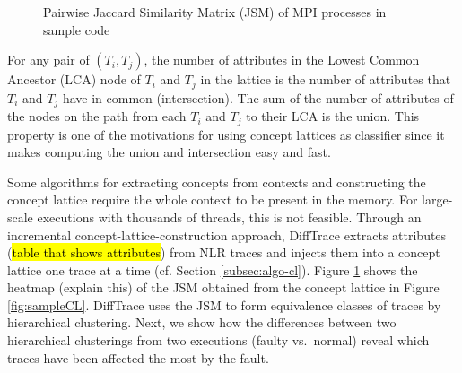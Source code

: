 
\begin{figure}[]
\centering
{}
\caption{Pairwise Jaccard Similarity Matrix (JSM) of MPI processes in sample code}
\label{fig:jsm2}
\end{figure}

For any pair of $(T_i, T_j)$, the number of attributes in the Lowest Common Ancestor (LCA) node of $T_i$ and $T_j$ in the lattice is the number of attributes that $T_i$ and $T_j$ have in common (intersection). The sum of the number of attributes of the nodes on the path from each $T_i$ and $T_j$ to their LCA is the union. This property is one of the motivations for using concept lattices as classifier since it makes computing the union and intersection easy and fast.

Some algorithms for extracting concepts from contexts and constructing the concept lattice require the whole context to be present in the memory.
%
For large-scale executions with thousands of threads, this is not feasible.
%
Through an incremental concept-lattice-construction approach, DiffTrace extracts attributes (\hl{table that shows attributes}) from NLR traces and injects them into a concept lattice one trace at a time (cf. Section \ref{subsec:algo-cl}).
%
Figure \ref{fig:jsm2} shows the heatmap (explain this) of the JSM obtained from the concept lattice in Figure \ref{fig:sampleCL}.
%
DiffTrace uses the JSM to form equivalence classes of traces by hierarchical clustering.
%
Next, we show how the differences between two hierarchical clusterings from two executions (faulty vs.~normal) reveal which traces have been affected the most by the fault.



